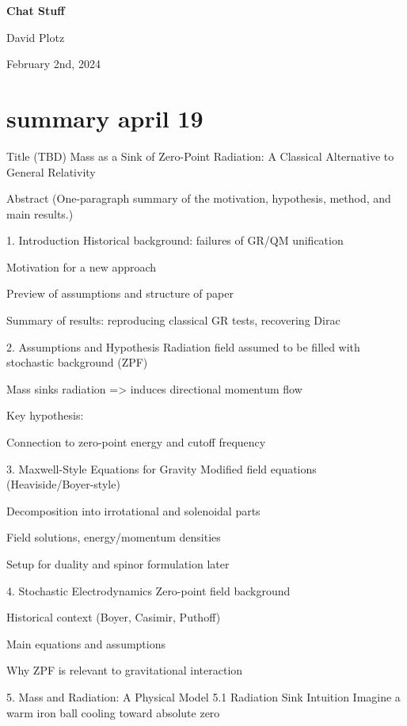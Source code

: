 \documentclass {article}
\begin{document}
\thispagestyle{empty}%

\begin{center}\strut
	\bfseries\Huge
	Chat Stuff
\end{center}


\centerline{David Plotz}


\begin{center}\strut
February 2nd, 2024
\end{center}
\vfill

	
\newpage

\section{summary april 19}
Title (TBD)
Mass as a Sink of Zero-Point Radiation: A Classical Alternative to General Relativity

Abstract
(One-paragraph summary of the motivation, hypothesis, method, and main results.)

1. Introduction
Historical background: failures of GR/QM unification

Motivation for a new approach

Preview of assumptions and structure of paper

Summary of results: reproducing classical GR tests, recovering Dirac

2. Assumptions and Hypothesis
Radiation field assumed to be filled with stochastic background (ZPF)

Mass sinks radiation =>  induces directional momentum flow

Key hypothesis:


Connection to zero-point energy and cutoff frequency

3. Maxwell-Style Equations for Gravity
Modified field equations (Heaviside/Boyer-style)

Decomposition into irrotational and solenoidal parts

Field solutions, energy/momentum densities

Setup for duality and spinor formulation later

4. Stochastic Electrodynamics
Zero-point field background

Historical context (Boyer, Casimir, Puthoff)

Main equations and assumptions

Why ZPF is relevant to gravitational interaction

5. Mass and Radiation: A Physical Model
5.1 Radiation Sink Intuition
Imagine a warm iron ball cooling toward absolute zero
\end{document}
